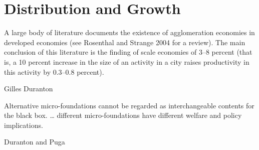 \chapter{Distribution and Growth} \label{chapter-distribution}

\epigraph{A large body of literature documents the existence of agglomeration economies in developed economies (see Rosenthal and Strange 2004 for a review). The main conclusion of this literature is the finding of scale economies of 3--8 percent (that is, a 10 percent increase in the size of an activity in a city raises productivity in this activity by 0.3--0.8 percent).}{Gilles Duranton \cite{durantonAreCitiesEngines2009}} 

\epigraph{Alternative micro-foundations cannot be regarded as interchangeable contents for the black box. \dots%
different micro-foundations have different welfare and policy implications. %
}{Duranton and Puga \cite{durantonMicroFoundationsUrbanAgglomeration2004}}





